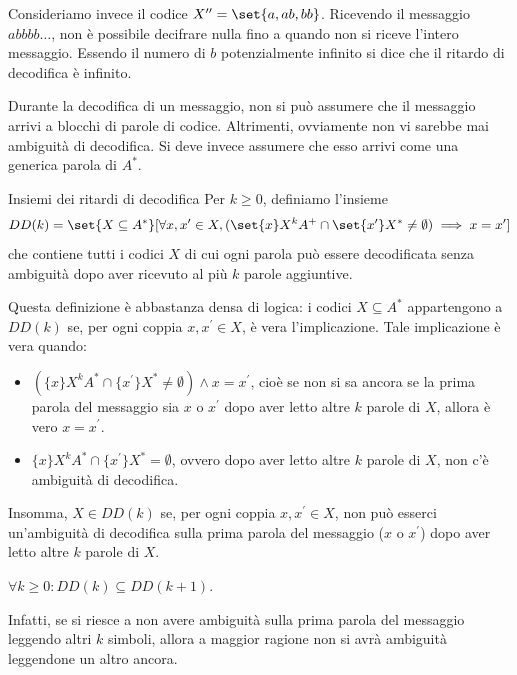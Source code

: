 Consideriamo invece il codice \(X'' = \set{a,ab,bb}\). Ricevendo il messaggio \(abbbb\ldots\), non è possibile
decifrare nulla fino a quando non si riceve l'intero messaggio.
Essendo il numero di \(b\) potenzialmente infinito si dice che il ritardo di decodifica è infinito.

\begin{note}{}
  Durante la decodifica di un messaggio, non si può assumere che il messaggio arrivi a blocchi di parole di codice. Altrimenti, ovviamente non vi sarebbe mai ambiguità di decodifica. Si deve invece assumere che esso arrivi come una generica parola di $A^{*}$.
\end{note}

\begin{definition}[label=def:decoding-delay-sets]{Insiemi dei ritardi di decodifica}
  Per \(k\geq 0\), definiamo l'insieme
  \begin{equation*}
    DD(k) = \set{X\subseteq A^* }[\forall x,x' \in X, (\set{x}X^k A^+ \cap \set{x'}X^* \neq \emptyset) \implies x = x']
  \end{equation*}
  che contiene tutti i codici \(X\) di cui ogni parola può essere decodificata senza ambiguità dopo aver ricevuto al più \(k\) parole aggiuntive.
\end{definition}

Questa definizione è abbastanza densa di logica: i codici $X \subseteq A^{*}$ appartengono a $DD(k)$ se, per ogni coppia $x,x^{'} \in X$, è vera l'implicazione. Tale implicazione è vera quando:
\begin{itemize}
  \item $\left(\{x\}X^{k}A^{*} \cap \{x^{'}\}X^{*} \neq \emptyset \right) \wedge x=x^{'}$, cioè se non si sa ancora se la prima parola del messaggio sia $x$ o $x^{'}$ dopo aver letto altre $k$ parole di $X$, allora è vero $x=x^{'}$.
  \item $\{x\}X^{k}A^{*} \cap \{x^{'}\}X^{*} = \emptyset$, ovvero dopo aver letto altre $k$ parole di $X$, non c'è ambiguità di decodifica.
\end{itemize}
Insomma, $X \in DD(k)$ se, per ogni coppia $x,x^{'} \in X$, non può esserci un'ambiguità di decodifica sulla prima parola del messaggio ($x$ o $x^{'}$) dopo aver letto altre $k$ parole di $X$.

\begin{proposition}{}
$\forall k\geq 0: DD(k) \subseteq DD(k+1)$.
\end{proposition}

Infatti, se si riesce a non avere ambiguità sulla prima parola del messaggio leggendo altri $k$ simboli, allora a maggior ragione non si avrà ambiguità leggendone un altro ancora.

